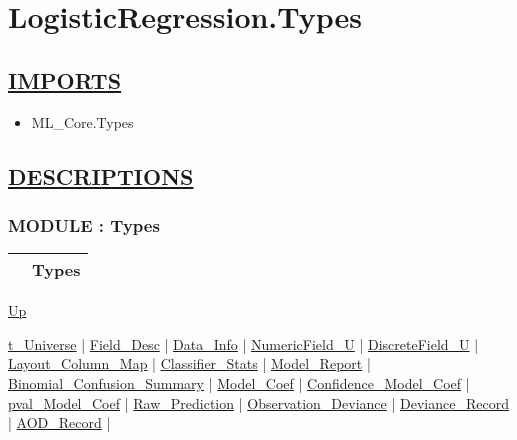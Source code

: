 \chapter*{LogisticRegression.Types}
\hypertarget{ecldoc:toc:LogisticRegression.Types}{}

\section*{\underline{IMPORTS}}
\begin{itemize}
\item ML\_Core.Types
\end{itemize}

\section*{\underline{DESCRIPTIONS}}
\subsection*{MODULE : Types}
\hypertarget{ecldoc:LogisticRegression.Types}{}

{\renewcommand{\arraystretch}{1.5}
\begin{tabularx}{\textwidth}{|>{\raggedright\arraybackslash}l|X|}
\hline
\hspace{0pt} & Types \\
\hline
\end{tabularx}
}

\hyperlink{ecldoc:toc:LogisticRegression}{Up}

\par


\hyperlink{ecldoc:logisticregression.types.t_universe}{t\_Universe}  |
\hyperlink{ecldoc:logisticregression.types.field_desc}{Field\_Desc}  |
\hyperlink{ecldoc:logisticregression.types.data_info}{Data\_Info}  |
\hyperlink{ecldoc:logisticregression.types.numericfield_u}{NumericField\_U}  |
\hyperlink{ecldoc:logisticregression.types.discretefield_u}{DiscreteField\_U}  |
\hyperlink{ecldoc:logisticregression.types.layout_column_map}{Layout\_Column\_Map}  |
\hyperlink{ecldoc:logisticregression.types.classifier_stats}{Classifier\_Stats}  |
\hyperlink{ecldoc:logisticregression.types.model_report}{Model\_Report}  |
\hyperlink{ecldoc:logisticregression.types.binomial_confusion_summary}{Binomial\_Confusion\_Summary}  |
\hyperlink{ecldoc:logisticregression.types.model_coef}{Model\_Coef}  |
\hyperlink{ecldoc:logisticregression.types.confidence_model_coef}{Confidence\_Model\_Coef}  |
\hyperlink{ecldoc:logisticregression.types.pval_model_coef}{pval\_Model\_Coef}  |
\hyperlink{ecldoc:logisticregression.types.raw_prediction}{Raw\_Prediction}  |
\hyperlink{ecldoc:logisticregression.types.observation_deviance}{Observation\_Deviance}  |
\hyperlink{ecldoc:logisticregression.types.deviance_record}{Deviance\_Record}  |
\hyperlink{ecldoc:logisticregression.types.aod_record}{AOD\_Record}  |

